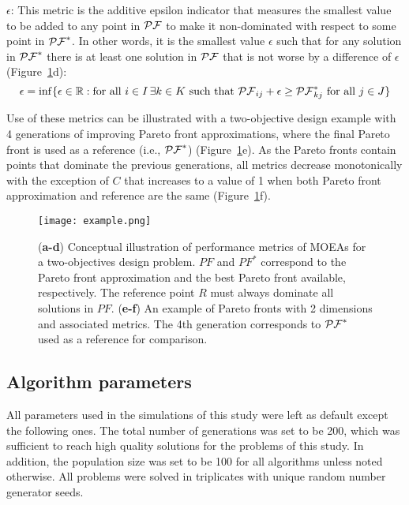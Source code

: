 {$\epsilon$: This metric is the additive epsilon indicator \cite{zitzler2002} that measures the smallest value to be added to any point in $\mathcal{PF}$ to make it non-dominated with respect to some point in  $\mathcal{PF}^*$. In other words, it is the smallest value $\epsilon$ such that for any solution in $\mathcal{PF}^*$ there is at least one solution in $\mathcal{PF}$ that is not worse by a difference of $\epsilon$ (Figure~\ref{fig4:example}d):
\begin{equation}
	\epsilon = \inf\{\epsilon \in \mathbb{R} : \textrm{for all }i \in I \, \exists k \in K \textrm{ such that } \mathcal{PF}_{ij} + \epsilon \ge \mathcal{PF}^*_{kj} \textrm{ for all } j \in J\}
\end{equation}

Use of these metrics can be illustrated with a two-objective design example with 4 generations of improving Pareto front approximations, where the final Pareto front is used as a reference (i.e., $\mathcal{PF}^*$) (Figure~\ref{fig4:example}e). As the Pareto fronts contain points that dominate the previous generations, all metrics decrease monotonically with the exception of $C$ that increases to a value of 1 when both Pareto front approximation and reference are the same (Figure~\ref{fig4:example}f).

\begin{figure}[H]
\centering
\texttt{[image: example.png]}
    \caption[Conceptual illustration of performance metrics]{(\textbf{a-d}) Conceptual illustration of performance metrics of MOEAs for a two-objectives design problem. $PF$ and $PF^*$ correspond to the Pareto front approximation and the best Pareto front available, respectively. The reference point $R$ must always dominate all solutions in $PF$. (\textbf{e-f}) An example of Pareto fronts with 2 dimensions and associated metrics. The 4th generation corresponds to $\mathcal{PF}^*$ used as a reference for comparison.}
\label{fig4:example}
\end{figure}

\subsection{Algorithm parameters}
All parameters used in the simulations of this study were left as default except the following ones. The total number of generations was set to be 200, which was sufficient to reach high quality solutions for the problems of this study. In addition, the population size was set to be 100 for all algorithms unless noted otherwise.  All problems were solved in triplicates with unique random number generator seeds.

}
